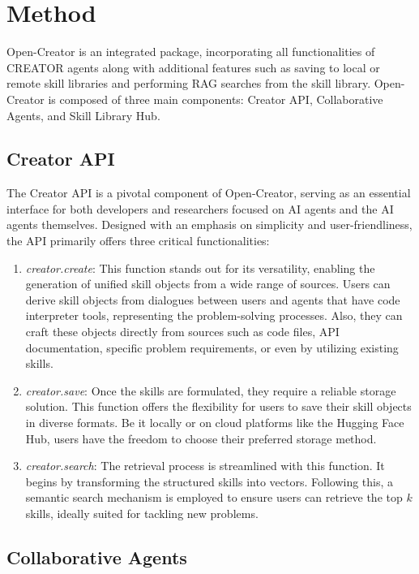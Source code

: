 \section{Method}


Open-Creator is an integrated package, incorporating all functionalities of CREATOR agents along with additional features such as saving to local or remote skill libraries and performing RAG searches from the skill library. Open-Creator is composed of three main components: Creator API, Collaborative Agents, and Skill Library Hub.

\subsection{Creator API}

The Creator API is a pivotal component of Open-Creator, serving as an essential interface for both developers and researchers focused on AI agents and the AI agents themselves. Designed with an emphasis on simplicity and user-friendliness, the API primarily offers three critical functionalities:
\begin{enumerate}
    \item \textit{creator.create}: This function stands out for its versatility, enabling the generation of unified skill objects from a wide range of sources. Users can derive skill objects from dialogues between users and agents that have code interpreter tools, representing the problem-solving processes. Also, they can craft these objects directly from sources such as code files, API documentation, specific problem requirements, or even by utilizing existing skills.

    \item \textit{creator.save}: Once the skills are formulated, they require a reliable storage solution. This function offers the flexibility for users to save their skill objects in diverse formats. Be it locally or on cloud platforms like the Hugging Face Hub, users have the freedom to choose their preferred storage method.

    \item \textit{creator.search}: The retrieval process is streamlined with this function. It begins by transforming the structured skills into vectors. Following this, a semantic search mechanism is employed to ensure users can retrieve the top \( k \) skills, ideally suited for tackling new problems.
\end{enumerate}


\subsection{Collaborative Agents}

